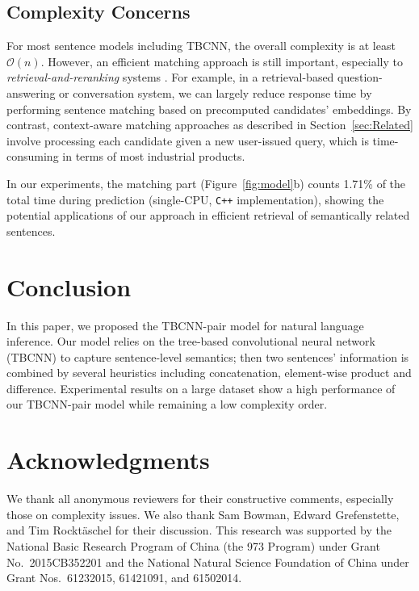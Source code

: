\documentclass[11pt]{article}
\begin{document}
\subsection{Complexity Concerns}



For most sentence models including TBCNN, the overall complexity is at least $\mathcal{O}(n)$. However, an efficient matching approach is still important, especially to \textit{retrieval-and-reranking} systems \cite{sigir,ijcai}. For example, in a retrieval-based question-answering or conversation system, we can largely reduce response time by performing sentence matching based on precomputed candidates' embeddings. By contrast, context-aware matching approaches as described in Section~\ref{sec:Related} involve processing each candidate given a new user-issued query, which is time-consuming in terms of most industrial products. 

In our experiments, the matching part (Figure~\ref{fig:model}b) counts 1.71\% of the total time during prediction (single-CPU, \texttt{C++} implementation), showing the potential applications of our approach in efficient retrieval of semantically related sentences.


\section{Conclusion}\label{sec:Conclusion}


In this paper, we proposed the TBCNN-pair model for natural language inference. Our model relies on the tree-based convolutional neural network (TBCNN) to capture sentence-level semantics; then two sentences' information is combined by several heuristics including concatenation, element-wise product and difference. Experimental results on a large dataset show a high performance of our TBCNN-pair model while remaining a low complexity order.



\section*{Acknowledgments}


We thank all anonymous reviewers for their constructive comments, especially those on complexity issues. We also thank Sam Bowman, Edward Grefenstette, and Tim Rockt\"aschel for their discussion. This research was supported by the National Basic Research Program of China (the 973 Program) under Grant No.~2015CB352201 and the National Natural Science Foundation of China under Grant Nos.~61232015, 61421091, and 61502014.

\newpage


\end{document}
